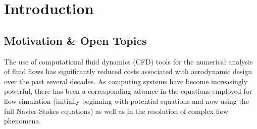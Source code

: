 \documentclass[12pt,Bold,letterpaper,TexShade]{mcgilletdclass}
\numberwithin{equation}{section}
\begin{document}
\begin{romanPagenumber}{2}%

%
%
\Dedication%

%
%
\Acknowledge%


%
\AbstractEn%

%
%
\AbstractFr%

\begingroup
\hypersetup{linkcolor=black}
%
%
%
\tableofcontents %
\listoftables %
\listoffigures %
\endgroup

\end{romanPagenumber}

 
\chapter{Introduction}
\section{Motivation \& Open Topics}

The use of computational fluid dynamics (CFD) tools for the numerical analysis of fluid flows has significantly reduced costs associated with aerodynamic design over the past several decades. As computing systems have become increasingly powerful, there has been a corresponding advance in the equations employed for flow simulation (initially beginning with potential equations and now using the full Navier-Stokes equations) as well as in the resolution of complex flow phenomena.
\end{document}
